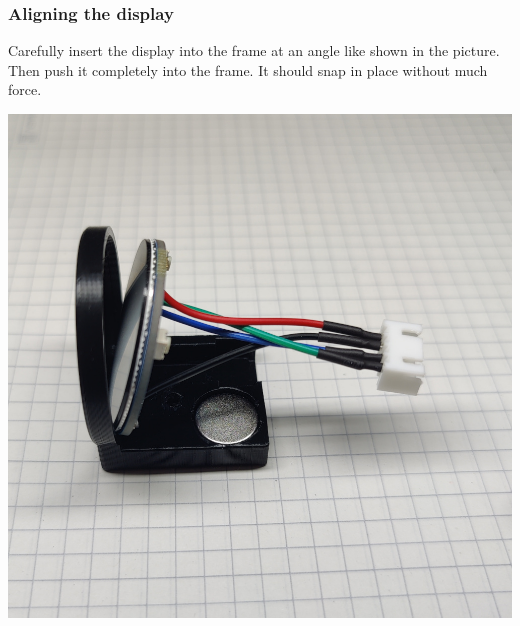 \documentclass[]{article}
\begin{document}
\subsubsection{Aligning the display}
\begin{minipage}[t]{0.5\linewidth}
	\vspace{0pt}
	Carefully insert the display into the frame at an angle like shown in the picture. Then push it completely into the frame. It should snap in place without much force.
\end{minipage}
\hfill
\begin{minipage}[t]{0.4\linewidth}
	\vspace{0pt}
	\includegraphics[width=\linewidth]{images/01_displayunit/13_insert_display.jpg}
\end{minipage}
\end{document}
